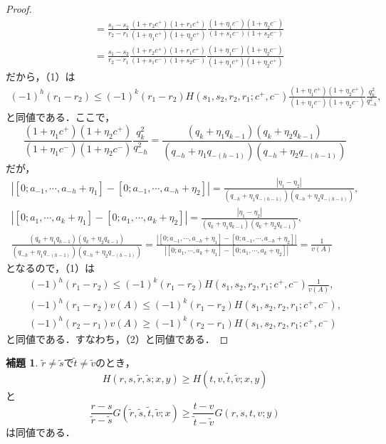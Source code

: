\documentclass[10pt,a4paper]{ujarticle}
\theoremstyle{definition}
\newtheorem{lemma}{補題}
\begin{document}
\begin{proof}
\begin{align*}
    &= \frac{s_1 - s_2}{r_2 - r_1} 
    \frac{(1 + r_2 c^+)(1 + r_1 c^+)}{(1 + \eta_1 c^+)(1 + \eta_2 c^+)}
    \frac{(1 + \eta_1 c^-)(1 + \eta_2 c^-)}{(1 + s_1 c^-)(1 + s_2 c^-)}\\
    &= \frac{s_1 - s_2}{r_2 - r_1} 
    \frac{(1 + r_2 c^+)(1 + r_1 c^+)}{(1 + s_1 c^-)(1 + s_2 c^-)}
    \frac{(1 + \eta_1 c^-)(1 + \eta_2 c^-)}{(1 + \eta_1 c^+)(1 + \eta_2 c^+)}
  \end{align*}
  だから，（1）は
  \begin{align*}
    (-1)^{h} (r_1 - r_2)
    \le (-1)^{k} (r_1 - r_2)H(s_1, s_2, r_2, r_1; c^+ , c^-)\frac{(1 + \eta_1 c^+)(1 + \eta_2 c^+)}{(1 + \eta_1 c^-)(1 + \eta_2 c^-)}\frac{q_k^2}{q_{-h}^2},
  \end{align*}
  と同値である．ここで，
  \[
  \frac{(1 + \eta_1 c^+)(1 + \eta_2 c^+)}{(1 + \eta_1 c^-)(1 + \eta_2 c^-)}\frac{q_k^2}{q_{-h}^2} 
  = \frac{(q_k + \eta_1 q_{k-1} )(q_k + \eta_2 q_{k-1})}{(q_{-h} + \eta_1 q_{-(h- 1)})(q_{-h} + \eta_2 q_{-(h-1)})}
  \]
  だが，
  \begin{align*}
  |[0; a_{-1}, \cdots, a_{-h} + \eta_1] - [0; a_{-1}, \cdots, a_{-h} + \eta_2]| = 
  \frac{|\eta_1 - \eta_2|}{(q_{-h} + \eta_1 q_{-(h- 1)})(q_{-h} + \eta_2 q_{-(h-1)})}, \\
  |[0; a_{1}, \cdots, a_{k} + \eta_1] - [0; a_{1}, \cdots, a_{k} + \eta_2]| = 
  \frac{|\eta_1 - \eta_2|}{(q_{k} + \eta_1 q_{k- 1})(q_{k} + \eta_2 q_{k-1})},\\
  \frac{(q_k + \eta_1 q_{k-1} )(q_k + \eta_2 q_{k-1})}{(q_{-h} + \eta_1 q_{-(h- 1)})(q_{-h} + \eta_2 q_{-(h-1)})} = 
  \frac{|[0; a_{-1}, \cdots, a_{-h} + \eta_1] - [0; a_{-1}, \cdots, a_{-h} + \eta_2]|}{|[0; a_{1}, \cdots, a_{k} + \eta_1] - [0; a_{1}, \cdots, a_{k} + \eta_2]|}
  = \frac{1}{v(A)}
  \end{align*}
  となるので，（1）は
  \begin{align*}
    (-1)^{h} (r_1 - r_2)
    \le (-1)^{k} (r_1 - r_2)H(s_1, s_2, r_2, r_1; c^+ , c^-)\frac{1}{v(A)}, \\
    (-1)^{h} (r_1 - r_2)v(A) \le (-1)^{k} (r_1 - r_2)H(s_1, s_2, r_2, r_1; c^+ , c^-), \\
    (-1)^{h} (r_2 - r_1)v(A) \ge (-1)^{k} (r_2 - r_1)H(s_1, s_2, r_2, r_1; c^+ , c^-)
  \end{align*}
  と同値である．すなわち，（2）と同値である．
\end{proof}
\begin{lemma}
  \label{Hilfsatz3}
  $\tilde{r}\neq\tilde{s}$で$\tilde{t}\neq\tilde{v}$のとき，
  \[
  H(r,s,\tilde{r},\tilde{s}; x, y) \ge H(t,v,\tilde{t},\tilde{v}; x, y)
  \]
  と
  \[
  \frac{r - s}{\tilde{r} - \tilde{s}}G(\tilde{r},\tilde{s},\tilde{t},\tilde{v}; x) \ge 
  \frac{t - v}{\tilde{t} - \tilde{v}}G(r,s,t,v;y)
  \]
  は同値である．
\end{lemma}
\end{document}
